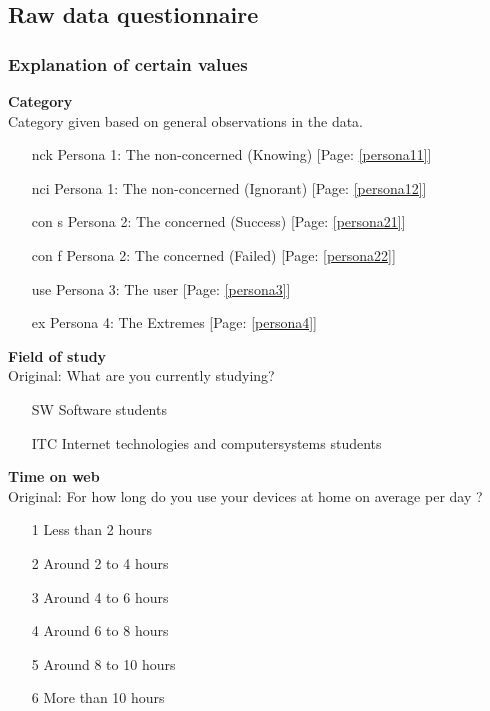 \subsection{Raw data questionnaire}
\label{appendix:rawdata}

\subsubsection{Explanation of certain values}

\noindent\textbf{Category} \hfill \\
Category given based on general observations in the data.
\begin{itemize}
    \item[nck] Persona 1: The non-concerned (Knowing) [Page: \ref{persona11}]
    \item[nci] Persona 1: The non-concerned (Ignorant) [Page: \ref{persona12}]
    \item[con s] Persona 2: The concerned (Success) [Page: \ref{persona21}]
    \item[con f] Persona 2: The concerned (Failed) [Page: \ref{persona22}]
    \item[use] Persona 3: The user [Page: \ref{persona3}]
    \item[ex] Persona 4: The Extremes [Page: \ref{persona4}]
\end{itemize}

\noindent\textbf{Field of study} \hfill \\
Original: What are you currently studying?
\begin{itemize}
    \item[SW] Software students
    \item[ITC] Internet technologies and computersystems students
\end{itemize}

\noindent\textbf{Time on web} \hfill \\
Original: For how long do you use your devices at home on average per day ?  
\begin{itemize}
    \item[1] Less than 2 hours
    \item[2] Around 2 to 4 hours
    \item[3] Around 4 to 6 hours
    \item[4] Around 6 to 8 hours
    \item[5] Around 8 to 10 hours
    \item[6] More than 10 hours
\end{itemize}

